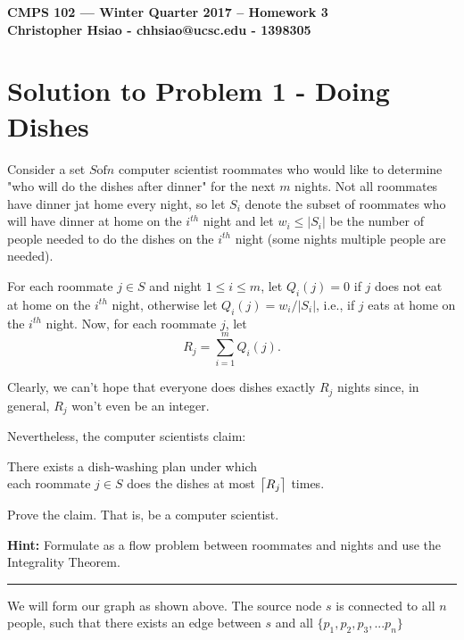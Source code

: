\documentclass[11pt]{article}
\DeclarePairedDelimiter{\ceil}{\lceil}{\rceil}
\begin{document}
\begin{center}
{\bf\Large CMPS 102 --- Winter Quarter 2017 --  Homework 3}\\
{\bf Christopher Hsiao - chhsiao@ucsc.edu - 1398305}
\end{center}

\section*{Solution to Problem 1 - Doing Dishes}

Consider a set $S \text{of} n$ computer scientist roommates who would like to determine "who will do the dishes after dinner" for the next $m$ nights. Not all roommates have dinner jat home every night, so let $S_i$ denote the subset of roommates who will have dinner at home on the $i^{th}$ night and let $w_i \leq |S_i|$ be the number of people needed to do the dishes on the $i^{th}$ night (some nights multiple people are needed).

For each roommate $j \in S$ and night $1 \leq i \leq m$, let $Q_i(j) = 0$ if $j$ does not eat at home on the $i^{th}$ night, otherwise let $Q_i(j) = w_i/|S_i|$, i.e., if $j$ eats at home on the $i^{th}$ night. Now, for each roommate $j$, let
\begin{equation}
	R_j = \sum_{i=1}^{m} Q_i(j) .
\end{equation}

Clearly, we can't hope that everyone does dishes exactly $R_j$ nights since, in general, $R_j$ won't even be an integer.

Nevertheless, the computer scientists claim:
\begin{center}
	There exists a dish-washing plan under which\\
	each roommate $j \in S$ does the dishes at most $\ceil[\big]{R_j}$ times.
\end{center}

Prove the claim. That is, be a computer scientist.

\textbf{Hint:} Formulate as a flow problem between roommates and nights and use the Integrality Theorem.

\noindent\rule{17cm}{0.4pt}


We will form our graph as shown above. The source node $s$ is connected to all $n$ people, such that there exists an edge between $s$ and all $\{p_1, p_2, p_3, ... p_n\}$

\pagebreak
\end{document}

